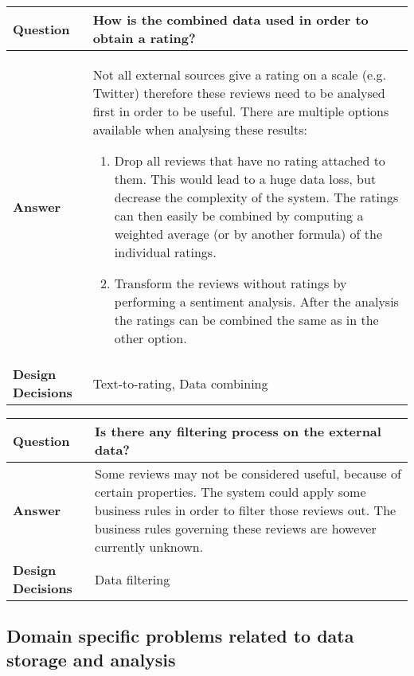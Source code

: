 \begin{longtable}{| l |  p{12cm} |}
\hline
\textbf{Question} & \textbf{How is the combined data used in order to obtain a rating?} \\ \hline
\textbf{Answer} &
	Not all external sources give a rating on a scale (e.g. Twitter) therefore these reviews need to be analysed first in order to be useful. There are multiple options available when analysing these results:
	\begin{enumerate}
	\item Drop all reviews that have no rating attached to them. This would lead to a huge data loss, but decrease the complexity 			of the system. The ratings can then easily be combined by computing a weighted average (or by another formula) of the individual ratings.	
	\item Transform the reviews without ratings by performing a sentiment analysis. After the analysis the ratings can be combined the same as in the other option.
\end{enumerate} \\ \hline
\textbf{Design Decisions} & Text-to-rating, Data combining \\ \hline
\end{longtable}

\newpage
\begin{longtable}{| l |  p{12cm} |}
\hline
\textbf{Question} & \textbf{Is there any filtering process on the external data?} \\ \hline
\textbf{Answer} &
	Some reviews may not be considered useful, because of certain properties. The system could apply some business rules in order to filter those reviews out. The business rules governing these reviews are however currently unknown. \\ \hline
\textbf{Design Decisions} & Data filtering \\ \hline
\end{longtable}


\subsection{Domain specific problems related to data storage and analysis}
